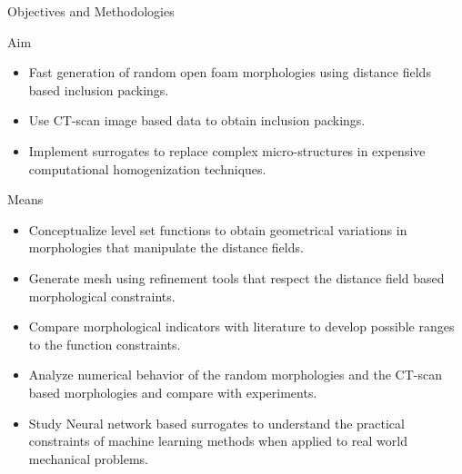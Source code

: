\documentclass[aspectratio=169,11pt]{beamer}
\begin{document}
\begin{frame}{Objectives and Methodologies}
\scriptsize{
\begin{block}{Aim}
	\begin{itemize}
		\item Fast generation of random open foam morphologies using distance fields based inclusion packings.
		\item Use CT-scan image based data to obtain inclusion packings.
		\item Implement surrogates to replace complex micro-structures in expensive computational homogenization techniques.
	\end{itemize}
\end{block}
\begin{block}{Means}
\begin{itemize}
	\item Conceptualize level set functions to obtain geometrical variations in morphologies that manipulate the distance fields.
	\item Generate mesh using refinement tools that respect the distance field based morphological constraints.
	\item Compare morphological indicators with literature to develop possible ranges to the function constraints.
	\item Analyze numerical behavior of the random morphologies and the CT-scan based morphologies and compare with experiments.
	\item Study Neural network based surrogates to understand the practical constraints of machine learning methods when applied to real world mechanical problems.
\end{itemize}
\end{block}
}
\end{frame}
\end{document}

